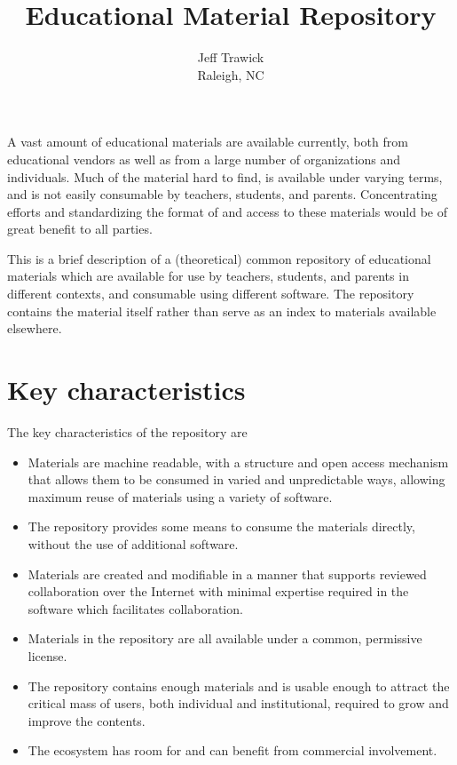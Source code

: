 
\title{Educational Material Repository}
\author{Jeff Trawick\\Raleigh, NC}
\maketitle
A vast amount of educational materials are available currently, both from
educational vendors as well as from a large number of
organizations and individuals.  Much of the material hard to find,
is available under varying terms, and is not easily consumable by teachers,
students, and parents.  Concentrating efforts and standardizing the format
of and access to these materials would be of great benefit to all parties.

This is a brief description of a (theoretical) common repository of educational
materials which are available for use by teachers, students, and parents in 
different contexts, and consumable using different software.  The repository contains
the material itself rather than serve as an index to materials available elsewhere.

\section*{Key characteristics}

The key characteristics of the repository are

\begin{itemize}
\item Materials are machine readable, with a structure and open access mechanism
that allows them to be consumed in varied and unpredictable ways, allowing
maximum reuse of materials using a variety of software.
\item The repository provides some means to consume the materials directly,
without the use of additional software.
\item Materials are created and modifiable in a manner that supports reviewed
collaboration over the Internet with minimal expertise required in the software
which facilitates collaboration.
\item Materials in the repository are all available under a common, permissive
license.
\item The repository contains enough materials and is usable enough to attract
the critical mass of users, both individual and institutional, required to 
grow and improve the contents.
\item The ecosystem has room for and can benefit from commercial involvement.
\end{itemize}

